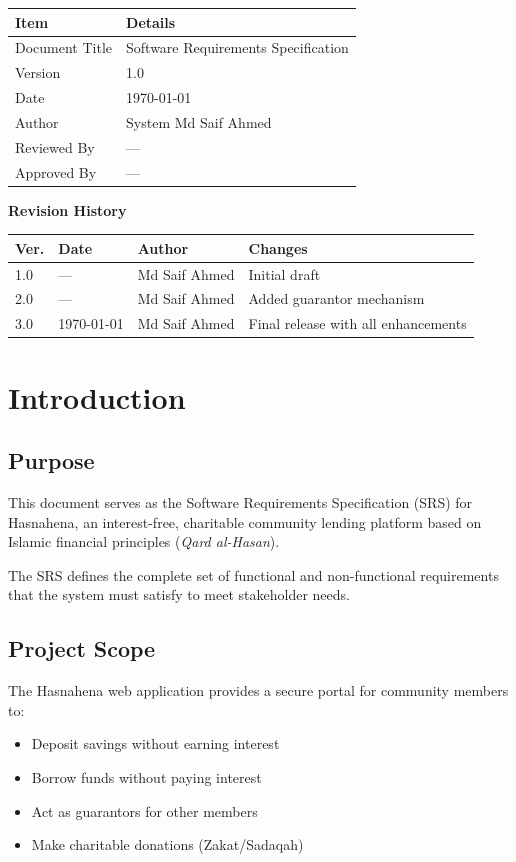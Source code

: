 \documentclass[11pt,a4paper]{article}
\newcommand{\DocumentTitle}{Software Requirements Specification}
\newcommand{\DocumentVersion}{1.0}
\newcommand{\DocumentDate}{\today}
\begin{document}
\begin{tabular}{@{}p{3cm}p{10cm}@{}}
\toprule
\textbf{Item} & \textbf{Details} \\
\midrule
Document Title & \DocumentTitle \\
Version & \DocumentVersion \\
Date & \DocumentDate \\
Author & System Md Saif Ahmed \\
Reviewed By & --- \\
Approved By & --- \\
\bottomrule
\end{tabular}

\vspace{1em}

\textbf{Revision History}

\begin{tabular}{@{}p{1.2cm}p{2.5cm}p{3.5cm}p{5.5cm}@{}}
\toprule
\textbf{Ver.} & \textbf{Date} & \textbf{Author} & \textbf{Changes} \\
\midrule
1.0 & --- & Md Saif Ahmed & Initial draft \\
2.0 & --- & Md Saif Ahmed & Added guarantor mechanism \\
3.0 & \DocumentDate & Md Saif Ahmed & Final release with all enhancements \\
\bottomrule
\end{tabular}

\newpage

\section{Introduction}

\subsection{Purpose}
This document serves as the Software Requirements Specification (SRS) for Hasnahena, an interest-free, charitable community lending platform based on Islamic financial principles (\textit{Qard al-Hasan}).

The SRS defines the complete set of functional and non-functional requirements that the system must satisfy to meet stakeholder needs.

\subsection{Project Scope}
The Hasnahena web application provides a secure portal for community members to:
\begin{itemize}
    \item Deposit savings without earning interest
    \item Borrow funds without paying interest
    \item Act as guarantors for other members
    \item Make charitable donations (Zakat/Sadaqah)
\end{itemize}
\end{document}
